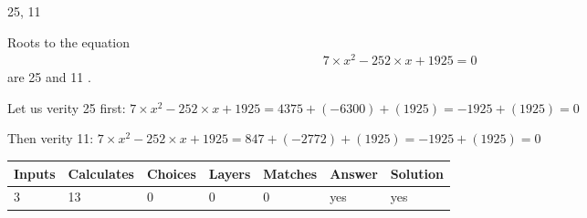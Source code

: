 \documentclass[12pt]{article}
\begin{document}
 
 
\noindent{}
 
 

25,  %
11
 
 
 
\noindent{}
 
 

 
 
 
\noindent{}
 
 

Roots to the equation
\begin{eqnarray*}
7 \times x^2  %
-252
                 \times x    %
+  %
1925 =0
\end{eqnarray*}
are  %
25 and  %
11 .
 
Let us verity  %
25 first:
$  %
7 \times x^2  %
-252
                 \times x    %
+  %
1925
  = %
4375+( %
-6300)+( %
1925)
  = %
-1925+( %
1925)
  = %
0
$
 
Then verity  %
11:
$  %
7 \times x^2  %
-252
                 \times x    %
+  %
1925
  = %
847+( %
-2772)+( %
1925)
  = %
-1925+( %
1925)
  = %
0
$
 
 
 
\noindent{}
 
 

 
\vspace{0.3in}
   
   
   
   
\noindent\begin{tabular}{|l|l|l|l|l|l|l|}
 \hline
Inputs & Calculates & Choices & Layers & Matches & Answer & Solution \\ \hline
           3  & 
          13  & 
           0
  & 
           0  & 
           0  & 
  yes & 
  yes 
  \\ \hline
 \end{tabular}
   
   
   
   
\noindent{}
   
   
  
\end{document}
